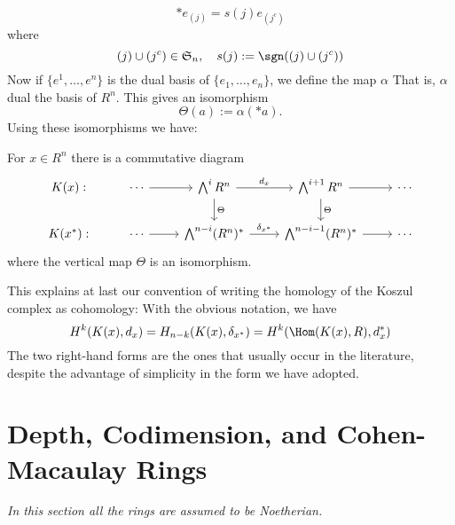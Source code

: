 \[\ast e_{(j)}=s(j)e_{(j^c)}\]
where
\[(j)\cup(j^c)\in\mathfrak{S}_n,\quad s(j):=\sgn((j)\cup(j^c))\]
Now if $\{e^1,\dots,e^n\}$ is the dual basis of $\{e_1,\dots,e_n\}$, we define the map $\alpha$
That is, $\alpha$ dual the basis of $R^n$. This gives an isomorphism 
\[\Theta(a):=\alpha(\ast a).\]
Using these isomorphisms we have:
\begin{proposition}
For $x\in R^n$ there is a commutative diagram
\[\begin{tikzcd}
K(x):&\cdots\ar[r]&\bigwedge^iR^n\ar[d,"\Theta"]\ar[r,"d_x"]&\bigwedge^{i+1}R^n\ar[r]\ar[d,"\Theta"]&\cdots\\
K(x^*):&\cdots\ar[r]&\bigwedge^{n-i}(R^n)^*\ar[r,"\delta_{x^*}"]&\bigwedge^{n-i-1}(R^n)^*\ar[r]&\cdots
\end{tikzcd}\]
where the vertical map $\Theta$ is an isomorphism.
\end{proposition}
This explains at last our convention of writing the homology of the Koszul
complex as cohomology: With the obvious notation, we have
\[H^k(K(x),d_x)=H_{n-k}(K(x),\delta_{x^*})=H^k(\Hom(K(x),R),d_x^*)\]
The two right-hand forms are the ones that usually occur in the literature,
despite the advantage of simplicity in the form we have adopted.
\section{Depth, Codimension, and Cohen-Macaulay Rings}
\textit{In this section all the rings are assumed to be Noetherian.}
